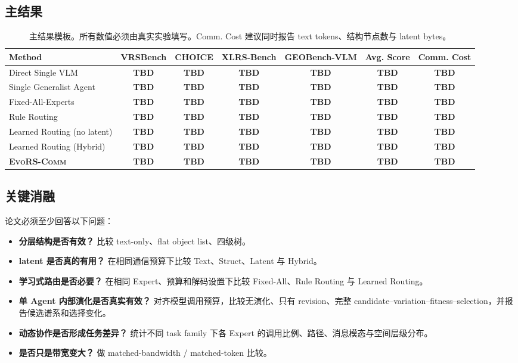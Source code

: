 \documentclass[10pt,a4paper,twocolumn]{ctexart}
\newcommand{\ours}{\textsc{EvoRS-Comm}}
\newcommand{\todo}{\textcolor{cred}{\textbf{TBD}}}
\begin{document}
\subsection{主结果}
\begin{table}[t]
\centering
\small
\caption{主结果模板。所有数值必须由真实实验填写。Comm. Cost 建议同时报告 text tokens、结构节点数与 latent bytes。}
\begin{tabular}{lcccccc}
\toprule
Method & VRSBench & CHOICE & XLRS-Bench & GEOBench-VLM & Avg. Score & Comm. Cost \\
\midrule
Direct Single VLM & \todo & \todo & \todo & \todo & \todo & \todo \\
Single Generalist Agent & \todo & \todo & \todo & \todo & \todo & \todo \\
Fixed-All-Experts & \todo & \todo & \todo & \todo & \todo & \todo \\
Rule Routing & \todo & \todo & \todo & \todo & \todo & \todo \\
Learned Routing (no latent) & \todo & \todo & \todo & \todo & \todo & \todo \\
Learned Routing (Hybrid) & \todo & \todo & \todo & \todo & \todo & \todo \\
\textbf{\ours} & \todo & \todo & \todo & \todo & \todo & \todo \\
\bottomrule
\end{tabular}
\label{tab:main}
\end{table}

\subsection{关键消融}
论文必须至少回答以下问题：
\begin{itemize}
    \item \textbf{分层结构是否有效？} 比较 text-only、flat object list、四级树。
    \item \textbf{latent 是否真的有用？} 在相同通信预算下比较 Text、Struct、Latent 与 Hybrid。
    \item \textbf{学习式路由是否必要？} 在相同 Expert、预算和解码设置下比较 Fixed-All、Rule Routing 与 Learned Routing。
    \item \textbf{单 Agent 内部演化是否真实有效？} 对齐模型调用预算，比较无演化、只有 revision、完整 candidate--variation--fitness--selection，并报告候选谱系和选择变化。
    \item \textbf{动态协作是否形成任务差异？} 统计不同 task family 下各 Expert 的调用比例、路径、消息模态与空间层级分布。
    \item \textbf{是否只是带宽变大？} 做 matched-bandwidth / matched-token 比较。
\end{itemize}
\end{document}
